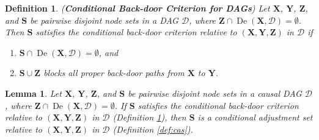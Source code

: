 \documentclass[twoside]{article}
\newtheorem{lemma}[theorem]{Lemma}
\newtheorem{definition}[theorem]{Definition}
\DeclareMathOperator{\De}{De}
\newcommand{\mb}[1]{\mathbf{#1}}
\newcommand{\g}[1][G]{\mathcal{#1}}
\begin{document}

\begin{definition}
\label{def:cbc}
{\normalfont (\textbf{Conditional Back-door Criterion for DAGs})}
    Let $\mb{X}$, $\mb{Y}$, $\mb{Z}$, and $\mb{S}$ be pairwise disjoint node sets in a DAG $\g[D]$, where $\mb{Z} \cap \De(\mb{X},\g[D]) = \emptyset$. Then $\mb{S}$ satisfies the conditional back-door criterion relative to $(\mb{X},\mb{Y},\mb{Z})$ in $\g[D]$ if 
    \begin{enumerate}[label=\emph{(\alph*)}]
        \item $\mb{S} \cap \De(\mb{X},\g[D]) = \emptyset$, and
        \item $\mb{S} \cup \mb{Z}$ blocks all proper back-door paths from $\mb{X}$ to $\mb{Y}$.
    \end{enumerate}
\end{definition}



\begin{lemma}
\label{lem:cbc-cas}
    Let $\mb{X}$, $\mb{Y}$, $\mb{Z}$, and $\mb{S}$ be pairwise disjoint node sets in a causal DAG $\g[D]$, where  $\mb{Z} \cap \De(\mb{X},\g[D]) = \emptyset$. If $\mb{S}$ satisfies the conditional back-door criterion relative to $(\mb{X},\mb{Y},\mb{Z})$ in $\g[D]$ (Definition \ref{def:cbc}), then $\mb{S}$ is a conditional adjustment set relative to $(\mb{X},\mb{Y},\mb{Z})$ in $\g[D]$ (Definition \ref{def:cas}).
\end{lemma}
\end{document}
